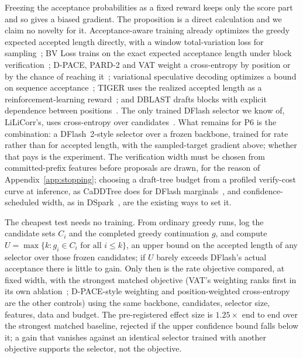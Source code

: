 Freezing the acceptance probabilities as a fixed reward keeps only the score part and so gives a biased gradient. The proposition is a direct calculation and we claim no novelty for it. Acceptance-aware training already optimizes the greedy expected accepted length directly, with a window total-variation loss for sampling~\cite{aadt}; BV Loss trains on the exact expected acceptance length under block verification~\cite{bvloss}; D-PACE, PARD-2 and VAT weight a cross-entropy by position or by the chance of reaching it~\cite{dpace,pard2,vat}; variational speculative decoding optimizes a bound on sequence acceptance~\cite{vsd}; TIGER uses the realized accepted length as a reinforcement-learning reward~\cite{tiger}; and DBLAST drafts blocks with explicit dependence between positions~\cite{dblast}. The only trained DFlash selector we know of, LiLiCorr's, uses cross-entropy over candidates~\cite{lilicorr}. What remains for P6 is the combination: a DFlash~2-style selector over a frozen backbone, trained for rate rather than for accepted length, with the sampled-target gradient above; whether that pays is the experiment. The verification width must be chosen from committed-prefix features before proposals are drawn, for the reason of Appendix~\ref{app:stopping}; choosing a draft-tree budget from a profiled verify-cost curve at inference, as CaDDTree does for DFlash marginals~\cite{caddtree}, and confidence-scheduled width, as in DSpark~\cite{dspark}, are the existing ways to set it.

The cheapest test needs no training. From ordinary greedy runs, log the candidate sets $C_i$ and the completed greedy continuation $g$, and compute $U=\max\{k:g_i\in C_i\text{ for all }i\le k\}$, an upper bound on the accepted length of any selector over those frozen candidates; if $U$ barely exceeds DFlash's actual acceptance there is little to gain. Only then is the rate objective compared, at fixed width, with the strongest matched objective (VAT's weighting ranks first in its own ablation~\cite{vat}; D-PACE-style weighting and position-weighted cross-entropy are the other controls) using the same backbone, candidates, selector size, features, data and budget. The pre-registered effect size is $1.25\times$ end to end over the strongest matched baseline, rejected if the upper confidence bound falls below it; a gain that vanishes against an identical selector trained with another objective supports the selector, not the objective.

